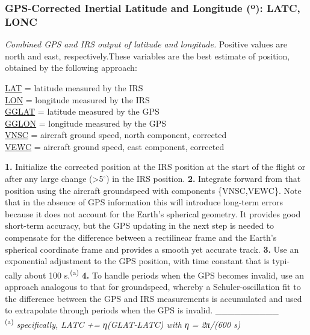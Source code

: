 \documentclass[
  english,
]{book}
\begin{document}
\hypertarget{latc-lonc}{%
\subsubsection*{\texorpdfstring{GPS-Corrected Inertial Latitude and
Longitude ({º}): LATC,
LONC}{GPS-Corrected Inertial Latitude and Longitude (º): LATC, LONC}}\label{latc-lonc}}

\emph{Combined GPS and IRS output of latitude and longitude.} Positive
values are north and east, respectively.These variables are the best
estimate of position, obtained by the following approach:

\protect\hyperlink{latitude}{LAT} = latitude measured by the IRS\\
\protect\hyperlink{longitude}{LON} = longitude measured by the IRS\\
\protect\hyperlink{gglat}{GGLAT} = latitude measured by the GPS\\
\protect\hyperlink{gglon}{GGLON} = longitude measured by the GPS\\
\protect\hyperlink{vewc-vnsc}{VNSC} = aircraft ground speed, north
component, corrected\\
\protect\hyperlink{vewc-vnsc}{VEWC} = aircraft ground speed, east
component, corrected

\textbf{1.} Initialize the corrected position at the IRS position at the
start of the flight or after any large change (\textgreater5\(^\circ\))
in the IRS position. \textbf{2.} Integrate forward from that position
using the aircraft groundspeed with components \{VNSC,VEWC\}. Note that
in the absence of GPS information this will introduce long-term errors
because it does not account for the Earth's spherical geometry. It
provides good short-term accuracy, but the GPS updating in the next step
is needed to compensate for the difference between a rectilinear frame
and the Earth's spherical coordinate frame and provides a smooth yet
accurate track. \textbf{3.} Use an exponential adjustment to the GPS
position, with time constant that is typi- cally about 100
s.\textsuperscript{(a)} \textbf{4.} To handle periods when the GPS
becomes invalid, use an approach analogous to that for groundspeed,
whereby a Schuler-oscillation fit to the difference between the GPS and
IRS measurements is accumulated and used to extrapolate through periods
when the GPS is invalid. \_\_\_\_\_\_\_\_\_\_\\
\textsuperscript{(a)} \emph{specifically, LATC += η(GLAT-LATC) with η =
2π/(600 s)}
\end{document}
